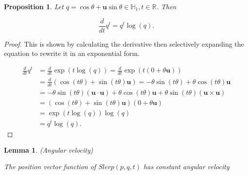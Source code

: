 \documentclass[a4paper, 11pt]{article}
\newtheorem{lemma}{Lemma}
\newtheorem{proposition}{Proposition}
\begin{document}
\begin{proposition}
    Let $q = \cos\theta + \boldsymbol{u}\sin\theta  \in \mathbb{H}_1 , t\in \mathbb{R}$. Then

    \[\frac{d}{dt} q^t = q^t\log(q).\] \citep[p.~23]{dam_koch_lillholm_1998}
\end{proposition}
\begin{proof}

    This is shown by calculating the derivative then selectively expanding the equation to rewrite it in an exponential form. 

    \begin{align*}
    \frac{d}{dt} q^t &=\frac{d}{dt}\exp(t\log(q))=\frac{d}{dt}\exp(t(0+\theta\boldsymbol{u}))\\&=\frac{d}{dt}(\cos (t \theta) + \sin (t\theta) \boldsymbol{u}) = -\theta\sin(t\theta) + \theta\cos(t\theta)\boldsymbol{u} \\ &=-\theta\sin(t\theta)(\boldsymbol{u}\cdot\boldsymbol{u})+\theta\cos(t\theta)\boldsymbol{u} + \theta\sin(t\theta)(\boldsymbol{u}\times\boldsymbol{u}) \\&= (\cos(t\theta) + \sin(t\theta)\boldsymbol{u})(0+\theta\boldsymbol{u}) \\&= \exp(t\log(q))\log(q) \\&= q^t\log(q).\end{align*}
    
\end{proof}

\begin{lemma}(Angular velocity)

The position vector function of $Slerp(p,q,t)$ has constant angular velocity \cite[pp.~45--46]{dam_koch_lillholm_1998}
\end{lemma}
\end{document}
